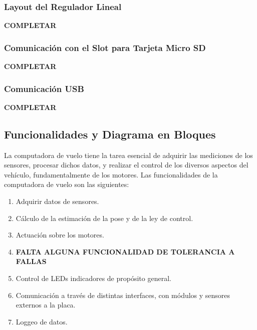 \subsubsection{Layout del Regulador Lineal}

\textbf{{\color{red} COMPLETAR}}

\subsubsection{Comunicación con el Slot para Tarjeta Micro SD}


\textbf{{\color{red} COMPLETAR}}

\subsubsection{Comunicación USB}


\textbf{{\color{red} COMPLETAR}}

\subsection{Funcionalidades y Diagrama en Bloques}



La computadora de vuelo tiene la tarea esencial de adquirir las mediciones de los sensores, procesar dichos datos, y realizar el control de los diversos aspectos del vehículo, fundamentalmente de los motores. Las funcionalidades de la computadora de vuelo son las siguientes:

\begin{enumerate}
    \item Adquirir datos de sensores.
    \item Cálculo de la estimación de la pose y de la ley de control.
    \item Actuación sobre los motores.
    \item \textbf{{\color{red} FALTA ALGUNA FUNCIONALIDAD DE TOLERANCIA A FALLAS}}
    \item Control de LEDs indicadores de propósito general.
    \item Comunicación a través de distintas interfaces, con módulos y sensores externos a la placa.
    \item Loggeo de datos.
\end{enumerate}

